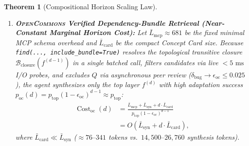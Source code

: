 \documentclass[10pt,twocolumn]{article}
\newtheorem{theorem}{Theorem}
\begin{document}
\begin{theorem}[Compositional Horizon Scaling Law]
\begin{enumerate}
    \begin{equation}
        \operatorname{Cost}_{\text{flat}}(d) = \frac{\bar{L}_{\text{base}} + d \cdot \bar{L}_{\text{grep}}}{p_1 (1 - \delta_{\text{bug}})^{d-1}} = \Theta\!\left(\frac{d \cdot \bar{L}_{\text{grep}}}{(1 - \delta_{\text{bug}})^{d}}\right).
        \label{eq:cost_flat}
    \end{equation}
    \item \textbf{\textsc{OpenCommons} Verified Dependency-Bundle Retrieval (Near-Constant Marginal Horizon Cost):} Let $\bar{L}_{\text{mcp}} \approx 681$ be the fixed minimal MCP schema overhead and $\bar{L}_{\text{card}}$ be the compact Concept Card size. Because \texttt{find(..., include\_bundle=True)} resolves the topological transitive closure $\mathcal{B}_{\text{closure}}(f^{(d-1)})$ in a single batched call, filters candidates via live $<5\text{ ms}$ I/O probes, and excludes $Q$ via asynchronous peer review ($\delta_{\text{bug}} \to \epsilon_{\text{oc}} \le 0.025$), the agent synthesizes only the top layer $f^{(d)}$ with high adaptation success $p_{\text{oc}}(d) = p_{\text{top}}(1 - \epsilon_{\text{oc}})^{d-1} \approx p_{\text{top}}$:
    \begin{equation}
    \begin{aligned}
        \operatorname{Cost}_{\text{oc}}(d) &= \frac{\bar{L}_{\text{mcp}} + \bar{L}_{\text{syn}} + d \cdot \bar{L}_{\text{card}}}{p_{\text{top}}(1 - \epsilon_{\text{oc}})^{d-1}} \\
        &= O\!\left(\bar{L}_{\text{syn}} + d \cdot \bar{L}_{\text{card}}\right),
    \end{aligned}
    \label{eq:cost_oc}
    \end{equation}
    where $\bar{L}_{\text{card}} \ll \bar{L}_{\text{syn}}$ ($\approx 76\text{--}341$ tokens vs.\ $14{,}500\text{--}26{,}760$ synthesis tokens).
\end{enumerate}
\end{theorem}
\end{document}
